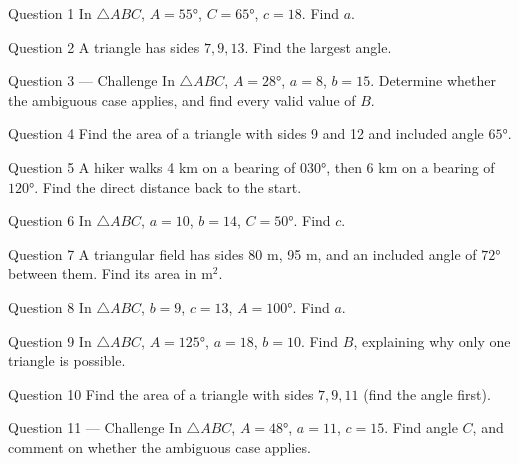 \documentclass[11pt]{article}
\begin{document}
\begin{qbox}{Question 1}
In $\triangle ABC$, $A=55°$, $C=65°$, $c=18$. Find $a$.\workspace{2.4cm}
\end{qbox}

\begin{qbox}{Question 2}
A triangle has sides $7,9,13$. Find the largest angle.\workspace{2.4cm}
\end{qbox}

\begin{qbox}{Question 3 --- Challenge}
In $\triangle ABC$, $A=28°$, $a=8$, $b=15$. Determine whether the ambiguous case applies, and find every valid value of $B$.\workspace{3.4cm}
\end{qbox}

\begin{qbox}{Question 4}
Find the area of a triangle with sides 9 and 12 and included angle $65°$.\workspace{2.4cm}
\end{qbox}

\begin{qbox}{Question 5}
A hiker walks 4 km on a bearing of $030°$, then 6 km on a bearing of $120°$. Find the direct distance back to the start.\workspace{2.4cm}
\end{qbox}

\begin{qbox}{Question 6}
In $\triangle ABC$, $a=10$, $b=14$, $C=50°$. Find $c$.\workspace{2.4cm}
\end{qbox}

\begin{qbox}{Question 7}
A triangular field has sides 80 m, 95 m, and an included angle of $72°$ between them. Find its area in m$^2$.\workspace{2.4cm}
\end{qbox}

\begin{qbox}{Question 8}
In $\triangle ABC$, $b=9$, $c=13$, $A=100°$. Find $a$.\workspace{2.4cm}
\end{qbox}

\begin{qbox}{Question 9}
In $\triangle ABC$, $A=125°$, $a=18$, $b=10$. Find $B$, explaining why only one triangle is possible.\workspace{2.4cm}
\end{qbox}

\begin{qbox}{Question 10}
Find the area of a triangle with sides $7,9,11$ (find the angle first).\workspace{2.4cm}
\end{qbox}

\begin{qbox}{Question 11 --- Challenge}
In $\triangle ABC$, $A=48°$, $a=11$, $c=15$. Find angle $C$, and comment on whether the ambiguous case applies.\workspace{3.4cm}
\end{qbox}
\end{document}

